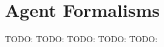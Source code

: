 \section{Agent Formalisms}
TODO: \cite{klugl_amason:_2013}
TODO: \cite{jennings_agent-based_2000}
TODO: \cite{wooldridge_introduction_2009}
TODO: \cite{wooldridge_intelligent_1995}
TODO: \cite{weiss_multiagent_2013}